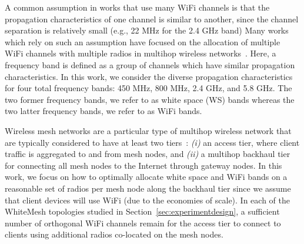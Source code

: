 %

A common assumption in works that use many WiFi channels is that the
propagation characteristics of one channel is similar to another, 
since the channel separation is relatively small (e.g., 22 MHz for 
the 2.4 GHz band)
Many works which rely on such an assumption have focused on the 
allocation of multiple WiFi channels with multiple radios in 
multihop wireless networks~\cite{si2010overview}.  Here, a frequency 
band is defined as a group of channels which have
similar propagation characteristics.
In this work, we consider the diverse propagation characteristics
for four total frequency bands: 450 MHz, 800 MHz, 2.4 GHz, and 5.8 GHz.
The two former frequency bands, we refer to as white space (WS) bands whereas
the two latter frequency bands, we refer to as WiFi bands.

Wireless mesh networks are a particular type of multihop wireless network
that are typically considered to have at least two
tiers~\cite{CRSK06}: {\it (i)} an access tier, where client traffic 
is aggregated to and from mesh nodes, and {\it (ii)} a multihop 
backhaul tier for connecting all mesh nodes to the Internet through 
gateway nodes. In this work, we focus on how to optimally allocate 
white space and WiFi bands on a reasonable set of radios per mesh node
along the backhaul tier since we assume that client devices will use 
WiFi (due to the economies of scale).  In each of the WhiteMesh 
topologies studied in Section~\ref{sec:experimentdesign}, a sufficient 
number of orthogonal WiFi channels remain for the access tier to 
connect to clients using additional radios co-located on the mesh nodes.


